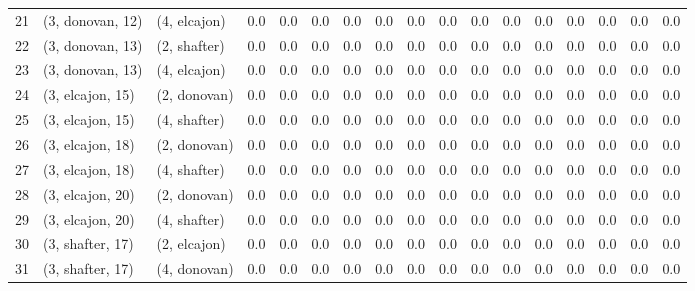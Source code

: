 \begin{tabular}{lllrrrrrrrrrrrrrr}
21 &  (3, donovan, 12) &     (4, elcajon) &      0.0 &     0.0 &        0.0 &       0.0 &      0.0 &      0.0 &      0.0 &        0.0 &       0.0 &     0.0 &     0.0 &     0.0 &       0.0 &      0.0 \\
22 &  (3, donovan, 13) &     (2, shafter) &      0.0 &     0.0 &        0.0 &       0.0 &      0.0 &      0.0 &      0.0 &        0.0 &       0.0 &     0.0 &     0.0 &     0.0 &       0.0 &      0.0 \\
23 &  (3, donovan, 13) &     (4, elcajon) &      0.0 &     0.0 &        0.0 &       0.0 &      0.0 &      0.0 &      0.0 &        0.0 &       0.0 &     0.0 &     0.0 &     0.0 &       0.0 &      0.0 \\
24 &  (3, elcajon, 15) &     (2, donovan) &      0.0 &     0.0 &        0.0 &       0.0 &      0.0 &      0.0 &      0.0 &        0.0 &       0.0 &     0.0 &     0.0 &     0.0 &       0.0 &      0.0 \\
25 &  (3, elcajon, 15) &     (4, shafter) &      0.0 &     0.0 &        0.0 &       0.0 &      0.0 &      0.0 &      0.0 &        0.0 &       0.0 &     0.0 &     0.0 &     0.0 &       0.0 &      0.0 \\
26 &  (3, elcajon, 18) &     (2, donovan) &      0.0 &     0.0 &        0.0 &       0.0 &      0.0 &      0.0 &      0.0 &        0.0 &       0.0 &     0.0 &     0.0 &     0.0 &       0.0 &      0.0 \\
27 &  (3, elcajon, 18) &     (4, shafter) &      0.0 &     0.0 &        0.0 &       0.0 &      0.0 &      0.0 &      0.0 &        0.0 &       0.0 &     0.0 &     0.0 &     0.0 &       0.0 &      0.0 \\
28 &  (3, elcajon, 20) &     (2, donovan) &      0.0 &     0.0 &        0.0 &       0.0 &      0.0 &      0.0 &      0.0 &        0.0 &       0.0 &     0.0 &     0.0 &     0.0 &       0.0 &      0.0 \\
29 &  (3, elcajon, 20) &     (4, shafter) &      0.0 &     0.0 &        0.0 &       0.0 &      0.0 &      0.0 &      0.0 &        0.0 &       0.0 &     0.0 &     0.0 &     0.0 &       0.0 &      0.0 \\
30 &  (3, shafter, 17) &     (2, elcajon) &      0.0 &     0.0 &        0.0 &       0.0 &      0.0 &      0.0 &      0.0 &        0.0 &       0.0 &     0.0 &     0.0 &     0.0 &       0.0 &      0.0 \\
31 &  (3, shafter, 17) &     (4, donovan) &      0.0 &     0.0 &        0.0 &       0.0 &      0.0 &      0.0 &      0.0 &        0.0 &       0.0 &     0.0 &     0.0 &     0.0 &       0.0 &      0.0 \\

\end{tabular}
